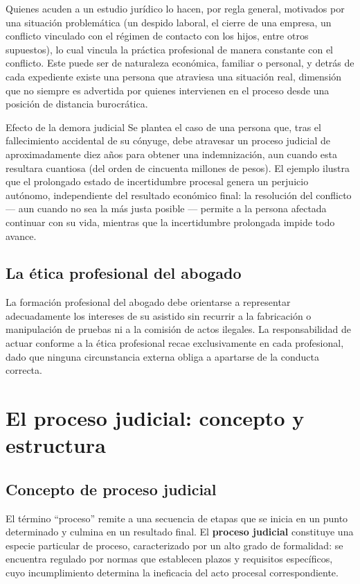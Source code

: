 \documentclass[12pt,oneside]{book}
\begin{document}
Quienes acuden a un estudio jurídico lo hacen, por regla general, motivados por una situación problemática (un despido laboral, el cierre de una empresa, un conflicto vinculado con el régimen de contacto con los hijos, entre otros supuestos), lo cual vincula la práctica profesional de manera constante con el conflicto. Este puede ser de naturaleza económica, familiar o personal, y detrás de cada expediente existe una persona que atraviesa una situación real, dimensión que no siempre es advertida por quienes intervienen en el proceso desde una posición de distancia burocrática.

\begin{example}{Efecto de la demora judicial}
Se plantea el caso de una persona que, tras el fallecimiento accidental de su cónyuge, debe atravesar un proceso judicial de aproximadamente diez años para obtener una indemnización, aun cuando esta resultara cuantiosa (del orden de cincuenta millones de pesos). El ejemplo ilustra que el prolongado estado de incertidumbre procesal genera un perjuicio autónomo, independiente del resultado económico final: la resolución del conflicto --- aun cuando no sea la más justa posible --- permite a la persona afectada continuar con su vida, mientras que la incertidumbre prolongada impide todo avance.
\end{example}

\subsection{La ética profesional del abogado}

La formación profesional del abogado debe orientarse a representar adecuadamente los intereses de su asistido sin recurrir a la fabricación o manipulación de pruebas ni a la comisión de actos ilegales. La responsabilidad de actuar conforme a la ética profesional recae exclusivamente en cada profesional, dado que ninguna circunstancia externa obliga a apartarse de la conducta correcta.

\section{El proceso judicial: concepto y estructura}

\subsection{Concepto de proceso judicial}

El término ``proceso'' remite a una secuencia de etapas que se inicia en un punto determinado y culmina en un resultado final. El \textbf{proceso judicial} constituye una especie particular de proceso, caracterizado por un alto grado de formalidad: se encuentra regulado por normas que establecen plazos y requisitos específicos, cuyo incumplimiento determina la ineficacia del acto procesal correspondiente.
\end{document}

